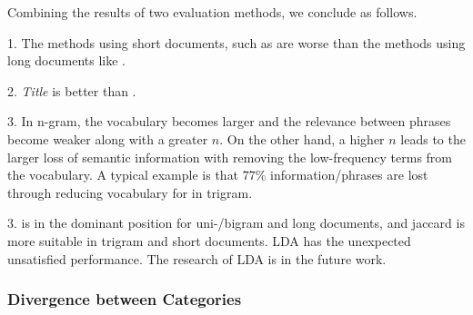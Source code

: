 Combining the results of two evaluation methods, we conclude as follows.

1. The methods using short documents, such as \ititle{} are worse than the methods using long documents like \icontent{}. 

2. \textit{Title} is better than \isummary{}.

3. In n-gram, the vocabulary becomes larger and the relevance between phrases become weaker along with a greater $n$. On the other hand, a higher $n$ leads to the larger loss of semantic information with removing the low-frequency terms from the vocabulary. A typical example is that $77\%$ information/phrases are lost through reducing vocabulary for \icontent{} in trigram. 

3. \tfidf{} is in the dominant position for uni-/bigram and long documents, and jaccard is more suitable in trigram and short documents. LDA has the unexpected unsatisfied performance. The research of LDA is in the future work. 




\subsubsection{Divergence between Categories}


